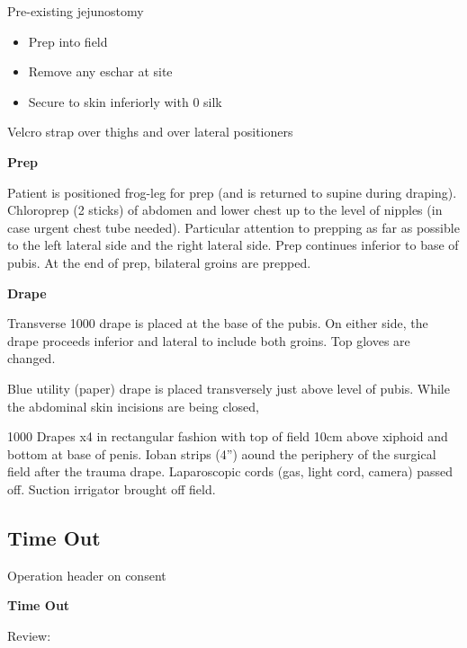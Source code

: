 \documentclass[
  letterpaper,
]{scrbook}
\providecommand{\tightlist}{%
  \setlength{\itemsep}{0pt}\setlength{\parskip}{0pt}}
\begin{document}
Pre-existing jejunostomy

\begin{itemize}
\tightlist
\item
  Prep into field
\item
  Remove any eschar at site
\item
  Secure to skin inferiorly with 0 silk
\end{itemize}

Velcro strap over thighs and over lateral positioners

\textbf{Prep}

Patient is positioned frog-leg for prep (and is returned to supine
during draping). Chloroprep (2 sticks) of abdomen and lower chest up to
the level of nipples (in case urgent chest tube needed). Particular
attention to prepping as far as possible to the left lateral side and
the right lateral side. Prep continues inferior to base of pubis. At the
end of prep, bilateral groins are prepped.

\textbf{Drape}

Transverse 1000 drape is placed at the base of the pubis. On either
side, the drape proceeds inferior and lateral to include both groins.
Top gloves are changed.

Blue utility (paper) drape is placed transversely just above level of
pubis. While the abdominal skin incisions are being closed,

1000 Drapes x4 in rectangular fashion with top of field 10cm above
xiphoid and bottom at base of penis. Ioban strips (4'') aound the
periphery of the surgical field after the trauma drape. Laparoscopic
cords (gas, light cord, camera) passed off. Suction irrigator brought
off field.

\subsection{Time Out}\label{time-out-1}

Operation header on consent

\textbf{Time Out}

Review:
\end{document}
